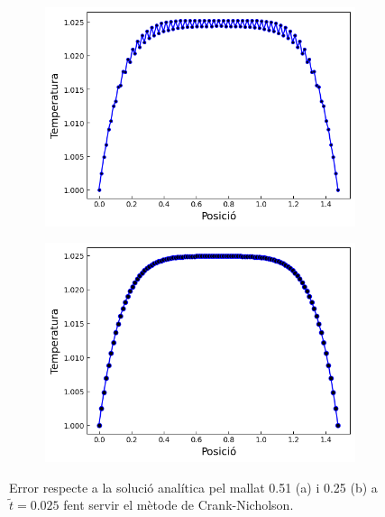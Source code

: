 \documentclass{article}
\begin{document}
\begin{figure}[h]
    \centering
    \begin{subfigure}[b]{0.35\textwidth}
        \includegraphics[width=\textwidth]{images/T_vs_z_at1.png} 
        \caption{}
        \label{fig:err_CN_at1}
    \end{subfigure}
    \hspace{1.5cm}
    \begin{subfigure}[b]{0.35\textwidth}
        \includegraphics[width=\textwidth]{images/T_vs_z_at2.png}
        \caption{} 
        \label{fig:err_CN_at2}
    \end{subfigure}
    \caption{Error respecte a la solució analítica pel mallat 0.51 (a) i 0.25 (b) a $\tilde{t}=0.025$ fent servir el mètode de Crank-Nicholson.}
    \label{fig:err_crank_nicholson}
\end{figure}
\end{document}

